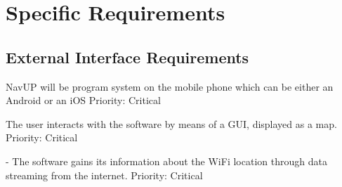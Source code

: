 \documentclass[12pt,a4paper]{article}
\begin{document}
\section{Specific Requirements}
	\begin{RequirementsEnum}
	\subsection{External Interface Requirements}
\item NavUP will be program system on the mobile phone which can be either an Android or an iOS\newline
    Priority: Critical
\item The user interacts with the software by means of a GUI, displayed as a map.\newline
    Priority: Critical
\item - The software gains its information about the WiFi location through data streaming from the internet.\newline
    Priority: Critical	


\end{RequirementsEnum}
\end{document}
